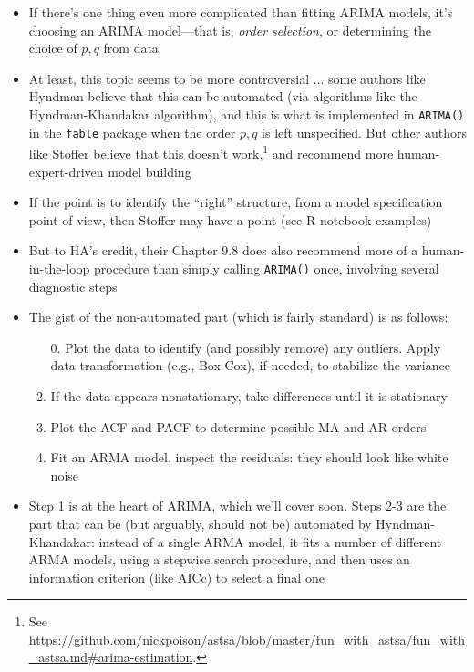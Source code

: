 \documentclass{article}
\begin{document}
\begin{itemize}
\item If there's one thing even more complicated than fitting ARIMA models, it's
  choosing an ARIMA model---that is, \emph{order selection}, or determining the 
  choice of $p,q$ from data 

\item At least, this topic seems to be more controversial ... some authors like
  Hyndman believe that this can be automated (via algorithms like the
  Hyndman-Khandakar algorithm), and this is what is implemented in
  \verb|ARIMA()| in the \verb|fable| package when the order $p,q$ is left 
  unspecified. But other authors like Stoffer believe that this doesn't
  work,\footnote{See
    \url{https://github.com/nickpoison/astsa/blob/master/fun_with_astsa/fun_with_astsa.md\#arima-estimation}.} 
  and recommend more human-expert-driven model building  

\item If the point is to identify the ``right'' structure, from a model
  specification point of view, then Stoffer may have a point (see R notebook 
  examples) 

\item But to HA's credit, their Chapter 9.8 does also recommend more of a 
  human-in-the-loop procedure than simply calling \verb|ARIMA()| once, involving
  several diagnostic steps 

\item The gist of the non-automated part (which is fairly standard) is as
  follows: 
  \begin{enumerate}
  \item[0.] Plot the data to identify (and possibly remove) any outliers. 
   Apply data transformation (e.g., Box-Cox), if needed, to stabilize the
   variance   
  \item If the data appears nonstationary, take differences until it is
    stationary 
  \item Plot the ACF and PACF to determine possible MA and AR orders 
  \item Fit an ARMA model, inspect the residuals: they should look like white 
    noise 
  \end{enumerate}

\item Step 1 is at the heart of ARIMA, which we'll cover soon. Steps 2-3 are the
  part that can be (but arguably, should not be) automated by Hyndman-Khandakar:  
  instead of a single ARMA model, it fits a number of different ARMA models,
  using a stepwise search procedure, and then uses an information criterion
  (like AICc) to select a final one 


\end{itemize}
\end{document}
